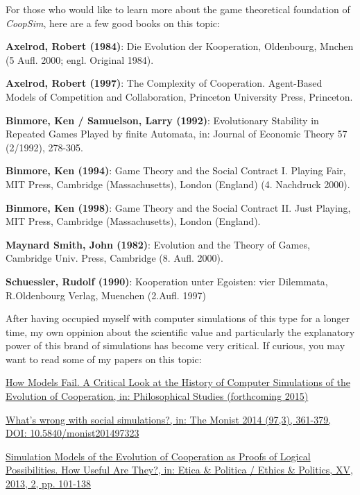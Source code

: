 \documentclass[12pt,a4paper,USenglish]{article}
\begin{document}
For those who would like to learn more about the game theoretical
foundation of {\em CoopSim}, here are a few good books on this
topic:

\setlength{\parindent}{0ex}
\setlength{\parskip}{2ex}

{\bf Axelrod, Robert (1984)}: Die Evolution der Kooperation,
Oldenbourg, Mnchen (5 Aufl. 2000; engl. Original 1984).

{\bf Axelrod, Robert (1997)}: The Complexity of Cooperation. Agent-Based Models of
Competition and Collaboration, Princeton University Press, Princeton.

{\bf Binmore, Ken / Samuelson, Larry (1992)}: Evolutionary Stability in
Repeated Games Played by finite Automata, in: Journal of Economic Theory 57
(2/1992), 278-305.

{\bf Binmore, Ken (1994)}: Game Theory and the Social Contract I. Playing
Fair, MIT Press, Cambridge (Massachusetts), London (England) (4. Nachdruck
2000).

{\bf Binmore, Ken (1998)}: Game Theory and the Social Contract II. Just
Playing, MIT Press, Cambridge (Massachusetts), London (England).

{\bf Maynard Smith, John (1982)}: Evolution and the Theory of Games, Cambridge
Univ. Press, Cambridge (8. Aufl. 2000).

{\bf Schuessler, Rudolf (1990)}: Kooperation unter Egoisten: vier Dilemmata,
R.Oldenbourg Verlag, Muenchen (2.Aufl. 1997)

After having occupied myself with computer simulations of this type for a
longer time, my own oppinion about the scientific value and particularly the
explanatory power of this brand of simulations has become very critical.  If
curious, you may want to read some of my papers on this topic:

\href{http://www.eckhartarnold.de/papers/2015_How_Models_Fail/How_models_fail.html}{How
  Models Fail. A Critical Look at the History of Computer Simulations
  of the Evolution of Cooperation, in: Philosophical Studies (forthcoming 2015)}

\href{http://www.eckhartarnold.de/papers/2014_Social_Simulations/Whats_wrong_with_social_simulations.html}{What's
  wrong with social simulations?, in: The Monist 2014 (97,3), 361-379, DOI: 10.5840/monist201497323}

\href{http://www.eckhartarnold.de/papers/2013_Simulations_as_Logical_Possibilities/Arnold_2013_Simulations_as_Proofs_of_Logical_Possibilities.pdf}{Simulation  Models  of   the  Evolution  of   Cooperation  as Proofs of  Logical Possibilities. How Useful Are They?, in: Etica \& Politica
/ Ethics \& Politics, XV, 2013, 2, pp. 101-138}
\end{document}
